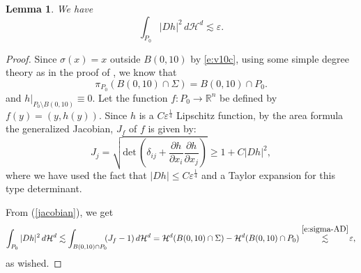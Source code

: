 \documentclass[11pt]{amsart}
\newcommand{\R}{{\mathbb R}}       %
\newcommand{\HH}{{\mathcal H}}
\newcommand{\rf}[1]{{(\ref{#1})}}
\newcommand{\ve}{{\varepsilon}}
\newtheorem{lemma}[theorem]{Lemma}
\theoremstyle{definition}
\theoremstyle{remark}
\numberwithin{equation}{section}
\def\cH{{\mathcal{H}}}
\def\lec{\lesssim}
\def\lec{\lesssim}
\newcommand{\jonas}[1]{}%
\begin{document}
 


\begin{lemma}
We have
\begin{equation}
\label{e:h-int}
\int_{P_{0}} |D h|^{2}\,d\HH^d
\lec \ve.
\end{equation}
\end{lemma}

\begin{proof}
Since $\sigma(x)=x$ outside $B(0,10)$ by \eqref{e:v10c}, using some simple degree theory as in the proof of  \cite[Theorem 13.1]{DT12}, we know that 
\[
\pi_{P_{0}}(B(0,10)\cap\Sigma)=B(0,10)\cap P_{0}. 
\]
{%
and $h|_{P_{0}\setminus B(0,10)}\equiv 0$. Let the function $f:P_0\to\R^n$ be defined by $f(y)=(y,h(y))$. Since $h$ is a $C\ve^{\frac{1}{4}}$ Lipschitz function, 
by the area formula the generalized Jacobian, $J_f$ of $f$ is given by:
\begin{equation}\label{jacobian}
J_j=\sqrt{\text{det}\,\left(\delta_{ij}+\frac{\partial h}{\partial x_i}\frac{\partial h}{\partial x_j}\right)}\ge 1 +C |D h|^{2},
\end{equation}
where we have used the fact that $ |D h|\le C\ve^{\frac{1}{4}}$ and a Taylor expansion for this type determinant.}\jonas{I'd say maybe do both since then it's a bit more self-contained. I don't have the book (and can't pirate it even), do you want to add the argument here?}


From \rf{jacobian}, we get
$$
\int_{P_{0}} |D h|^{2}\,d\HH^d
\lec \int_{B(0,10)\cap P_{0}}  \!\!(J_{f}-1)\,d\HH^d
=\cH^{d}(B(0,10)\cap \Sigma)-\cH^{d}(B(0,10)\cap P_{0})
\stackrel{\eqref{e:sigma-AD}}{\lec} \!\ve,
$$
as wished.
\end{proof}
\end{document}
